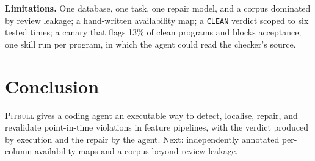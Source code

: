 \documentclass[letterpaper]{article} %
\begin{document}
\textbf{Limitations.} One database, one task, one repair model, and a
corpus dominated by review leakage; a hand-written availability map; a
\texttt{CLEAN} verdict scoped to six tested times; a canary that flags
13\% of clean programs and blocks acceptance; one skill run per program,
in which the agent could read the checker's source.

\section{Conclusion}

\textsc{Pitbull} gives a coding agent an executable way to detect, localise,
repair, and revalidate point-in-time violations in feature pipelines, with
the verdict produced by execution and the repair by the agent. Next: independently annotated per-column availability maps and a corpus
beyond review leakage.


\end{document}
